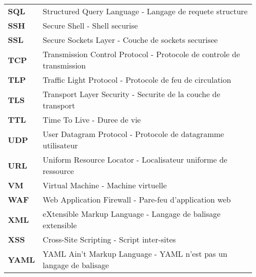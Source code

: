 \begin{longtable}{p{3cm} p{12cm}}
    \textbf{SQL}     & Structured Query Language - Langage de requete structure                                               \\[0.3cm]

    \textbf{SSH}     & Secure Shell - Shell securise                                                                          \\[0.3cm]

    \textbf{SSL}     & Secure Sockets Layer - Couche de sockets securisee                                                     \\[0.3cm]

    \textbf{TCP}     & Transmission Control Protocol - Protocole de controle de transmission                                  \\[0.3cm]

    \textbf{TLP}     & Traffic Light Protocol - Protocole de feu de circulation                                               \\[0.3cm]

    \textbf{TLS}     & Transport Layer Security - Securite de la couche de transport                                          \\[0.3cm]

    \textbf{TTL}     & Time To Live - Duree de vie                                                                            \\[0.3cm]

    \textbf{UDP}     & User Datagram Protocol - Protocole de datagramme utilisateur                                           \\[0.3cm]

    \textbf{URL}     & Uniform Resource Locator - Localisateur uniforme de ressource                                          \\[0.3cm]

    \textbf{VM}      & Virtual Machine - Machine virtuelle                                                                    \\[0.3cm]

    \textbf{WAF}     & Web Application Firewall - Pare-feu d'application web                                                  \\[0.3cm]

    \textbf{XML}     & eXtensible Markup Language - Langage de balisage extensible                                            \\[0.3cm]

    \textbf{XSS}     & Cross-Site Scripting - Script inter-sites                                                              \\[0.3cm]

    \textbf{YAML}    & YAML Ain't Markup Language - YAML n'est pas un langage de balisage                                     \\[0.3cm]
\end{longtable}

\newpage
